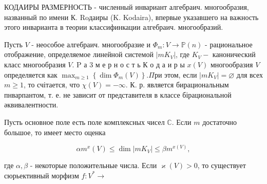 \documentclass[10pt]{article}
\begin{document}
КОДАИРЫ РАЗМЕРНОСТЬ - численный инвариант алгебраич. многообразия, названный по имени К. Roдаиры (K. Kodaira), впервые указавшего на важность этого инварианта в теории классифинкации алгебраич. многообразий.



Пусть $V$ - неособое алгебраич. многообразие и $\Phi_{m}: V \rightarrow \mathbb{P}(n)$ - рациональное отображение, определяемое линейной системой $\left|m K_{V}\right|$, где $K_{V}-$ канонический класс многообразия $V$. $\mathrm{P}$ а 3 м е р н о с т ь К о д а и р ы $x(V)$ многообразия $V$ определяется как $\max _{m \geqslant 1}\left\{\operatorname{dim} \Phi_{m}(V)\right\} . \Pi р и$ этом, если $\left|m K_{V}\right|=\varnothing$ для всех $m \geqslant 1$, то счітается, что $\chi(V)=-\infty$. К. р. является бирациональным пнварпантом, т. е. не зависит от представителя в классе бірациональной әквивалентности.



Пусть основное поле есть поле комплексных чисел $\mathbb{C}$. Если $m$ достаточно большое, то имеет место оценка



\[

\alpha m^{x}(V) \leqslant \operatorname{dim}\left|m K_{V}\right| \leqslant \beta m^{x(V)},

\]



где $\alpha, \beta$ - некоторые положительные числа. Если $\varkappa(V)>0$, то существует сюрьективный морфизм $f: V^{*} \rightarrow$
\end{document}
